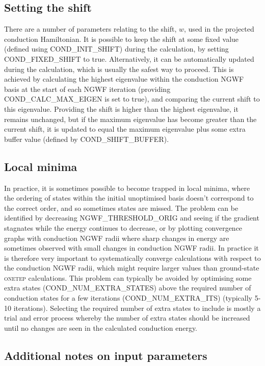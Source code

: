 \documentclass[a4paper,oneside,11pt]{article}
\begin{document}
\subsection*{Setting the shift}

There are a number of parameters relating to the shift, $w$, used in the projected conduction Hamiltonian.  It is possible to keep the shift at some fixed value (defined using COND\_INIT\_SHIFT) during the calculation, by setting COND\_FIXED\_SHIFT to true.  Alternatively, it can be automatically updated during the calculation, which is usually the safest way to proceed.  This is achieved by calculating the highest eigenvalue within the conduction NGWF basis at the start of each NGWF iteration (providing COND\_CALC\_MAX\_EIGEN is set to true), and comparing the current shift to this eigenvalue.  Providing the shift is higher than the highest eigenvalue, it remains unchanged, but if the maximum eigenvalue has become greater than the current shift, it is updated to equal the maximum eigenvalue plus some extra buffer value (defined by COND\_SHIFT\_BUFFER).

\subsection*{Local minima}

In practice, it is sometimes possible to become trapped in local minima, where the ordering of states within the initial unoptimised basis doesn't correspond to the correct order, and so sometimes states are missed.  The problem can be identified by decreasing NGWF\_THRESHOLD\_ORIG and seeing if the gradient stagnates while the energy continues to decrease, or by plotting convergence graphs with conduction NGWF radii where sharp changes in energy are sometimes observed with small changes in conduction NGWF radii.  In practice it is therefore very important to systematically converge calculations with respect to the conduction NGWF radii, which might require larger values than ground-state \textsc{onetep} calculations.  This problem can typically be avoided by optimising some extra states (COND\_NUM\_EXTRA\_STATES) above the required number of conduction states for a few iterations (COND\_NUM\_EXTRA\_ITS) (typically 5-10 iterations).  Selecting the required number of extra states to include is mostly a trial and error process whereby the number of extra states should be increased until no changes are seen in the calculated conduction energy.

\subsection*{Additional notes on input parameters}
\end{document}
